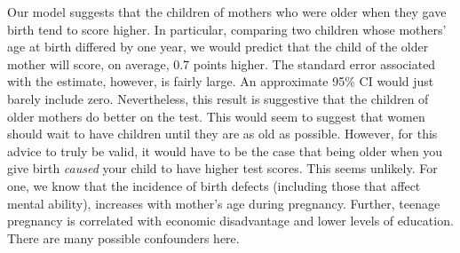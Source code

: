 \documentclass[addpoints,12pt]{exam}\usepackage[]{graphicx}\usepackage[]{color}
\newenvironment{knitrout}{}{} %
\begin{document}
\begin{questions}
\begin{parts}
\begin{solution}
\begin{knitrout}
\end{knitrout}
  Our model suggests that the children of mothers who were older when they gave birth tend to score higher. In particular, comparing two children whose mothers' age at birth differed by one year, we would predict that the child of the older mother will score, on average, 0.7 points higher. The standard error associated with the estimate, however, is fairly large. An approximate 95\% CI would just barely include zero. Nevertheless, this result is suggestive that the children of older mothers do better on the test. This would seem to suggest that women should wait to have children until they are as old as possible. However, for this advice to truly be valid, it would have to be the case that being older when you give birth \emph{caused} your child to have higher test scores. This seems unlikely. For one, we know that the incidence of birth defects (including those that affect mental ability), increases with mother's age during pregnancy. Further, teenage pregnancy is correlated with economic disadvantage and lower levels of education. There are many possible confounders here.
  \end{solution}

\end{parts}
\end{questions}
\end{document}
